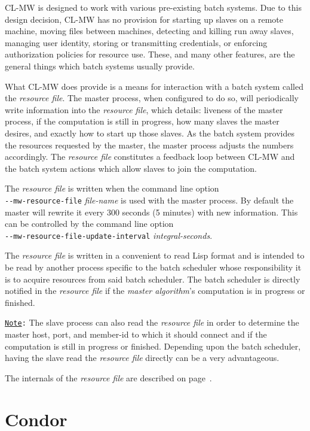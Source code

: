 \documentclass[titlepage,12pt]{book}
\newcommand{\xsmall}{\latexhtml{\small}{}}
\newcommand{\xnormalsize}{\latexhtml{\normalsize}{}}
\newcommand{\clmw}{\xsmall\textsc{CL-MW}\xnormalsize\xspace}
\newcommand{\ma}{\textit{master algorithm}\xspace}
\newcommand{\rfile}{\textit{resource file}\xspace}
\newcommand{\dash}{\texttt{-}}
\newcommand{\OptionV}[2]{\dash\dash\texttt{#1} \textit{#2}}
\newcommand{\Note}{\texttt{\underline{Note}:}\xspace}
\begin{document}
\clmw is designed to work with various pre-existing batch systems. Due
to this design decision, \clmw has no provision for starting up slaves
on a remote machine, moving files between machines, detecting and killing
run away slaves, managing user identity, storing or transmitting
credentials, or enforcing authorization policies for resource use.
These, and many other features, are the general things which batch
systems usually provide.

What \clmw does provide is a means for interaction with a batch system
called the \rfile.  The master process, when configured to do so,
will periodically write information into the \rfile, which details:
liveness of the master process, if the computation is still in progress,
how many slaves the master desires, and exactly how to start up those
slaves. As the batch system provides the resources requested by the
master, the master process adjusts the numbers accordingly. The
\rfile constitutes a feedback loop between \clmw and the batch
system actions which allow slaves to join the computation.

The \rfile is written when the command line option\\
\OptionV{mw-resource-file}{file-name} is used with the
master process. By default the master will rewrite it
every 300 seconds (5 minutes) with new information. This
can be controlled by the command line option\\
\OptionV{mw-resource-file-update-interval}{integral-seconds}.

The \rfile is written in a convenient to read Lisp format and is
intended to be read by another process specific to the batch scheduler
whose responsibility it is to acquire resources from said batch
scheduler. The batch scheduler is directly notified in the \rfile
if the {\ma}'s computation is in progress or finished.

\Note The slave process can also read the \rfile in order to determine
the master host, port, and member-id to which it should connect and
if the computation is still in progress or finished.  Depending upon
the batch scheduler, having the slave read the \rfile directly can
be a very advantageous.

The internals of the \rfile are described on
page~\pageref{resource-file}.

\section{Condor}
\end{document}
